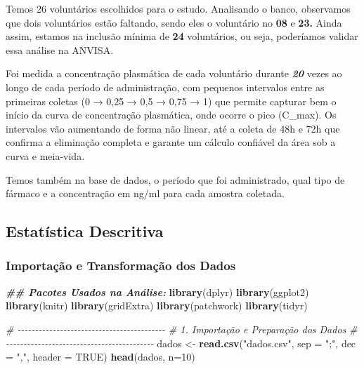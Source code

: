 \documentclass[
]{article}
\newenvironment{Shaded}{\begin{snugshade}}{\end{snugshade}}
\newcommand{\AttributeTok}[1]{\textcolor[rgb]{0.13,0.29,0.53}{#1}}
\newcommand{\CommentTok}[1]{\textcolor[rgb]{0.56,0.35,0.01}{\textit{#1}}}
\newcommand{\ConstantTok}[1]{\textcolor[rgb]{0.56,0.35,0.01}{#1}}
\newcommand{\DecValTok}[1]{\textcolor[rgb]{0.00,0.00,0.81}{#1}}
\newcommand{\DocumentationTok}[1]{\textcolor[rgb]{0.56,0.35,0.01}{\textbf{\textit{#1}}}}
\newcommand{\FunctionTok}[1]{\textcolor[rgb]{0.13,0.29,0.53}{\textbf{#1}}}
\newcommand{\NormalTok}[1]{#1}
\newcommand{\OtherTok}[1]{\textcolor[rgb]{0.56,0.35,0.01}{#1}}
\newcommand{\StringTok}[1]{\textcolor[rgb]{0.31,0.60,0.02}{#1}}
\begin{document}
Temos 26 voluntários escolhidos para o estudo. Analisando o banco,
observamos que dois voluntários estão faltando, sendo eles o voluntário
no \textbf{08} e \textbf{23.} Ainda assim, estamos na inclusão mínima de
\textbf{24} voluntários, ou seja, poderíamos validar essa análise na
ANVISA.

Foi medida a concentração plasmática de cada voluntário durante
\textbf{\emph{20}} vezes ao longo de cada período de administração, com
pequenos intervalos entre as primeiras coletas (0 → 0,25 → 0,5 → 0,75 →
1) que permite capturar bem o início da curva de concentração
plasmática, onde ocorre o pico (C\_max). Os intervalos vão aumentando de
forma não linear, até a coleta de 48h e 72h que confirma a eliminação
completa e garante um cálculo confiável da área sob a curva e meia-vida.

Temos também na base de dados, o período que foi administrado, qual tipo
de fármaco e a concentração em ng/ml para cada amostra coletada.

\hypertarget{estatuxedstica-descritiva}{%
\subsection{Estatística Descritiva}\label{estatuxedstica-descritiva}}

\hypertarget{importauxe7uxe3o-e-transformauxe7uxe3o-dos-dados}{%
\subsubsection{Importação e Transformação dos
Dados}\label{importauxe7uxe3o-e-transformauxe7uxe3o-dos-dados}}

\begin{Shaded}
\begin{Highlighting}[]
\DocumentationTok{\#\# Pacotes Usados na Análise:}
\FunctionTok{library}\NormalTok{(dplyr)}
\FunctionTok{library}\NormalTok{(ggplot2)}
\FunctionTok{library}\NormalTok{(knitr)}
\FunctionTok{library}\NormalTok{(gridExtra)}
\FunctionTok{library}\NormalTok{(patchwork)}
\FunctionTok{library}\NormalTok{(tidyr)}
\end{Highlighting}
\end{Shaded}

\begin{Shaded}
\begin{Highlighting}[]
\CommentTok{\# {-}{-}{-}{-}{-}{-}{-}{-}{-}{-}{-}{-}{-}{-}{-}{-}{-}{-}{-}{-}{-}{-}{-}{-}{-}{-}{-}{-}{-}{-}{-}{-}{-}{-}{-}{-}{-}{-}{-}{-}{-}{-}}
\CommentTok{\# 1. Importação e Preparação dos Dados}
\CommentTok{\# {-}{-}{-}{-}{-}{-}{-}{-}{-}{-}{-}{-}{-}{-}{-}{-}{-}{-}{-}{-}{-}{-}{-}{-}{-}{-}{-}{-}{-}{-}{-}{-}{-}{-}{-}{-}{-}{-}{-}{-}{-}{-}}
\NormalTok{dados }\OtherTok{\textless{}{-}} \FunctionTok{read.csv}\NormalTok{(}\StringTok{"dados.csv"}\NormalTok{, }\AttributeTok{sep =} \StringTok{";"}\NormalTok{, }\AttributeTok{dec =} \StringTok{","}\NormalTok{, }\AttributeTok{header =} \ConstantTok{TRUE}\NormalTok{)}
\FunctionTok{head}\NormalTok{(dados, }\AttributeTok{n=}\DecValTok{10}\NormalTok{)}
\end{Highlighting}
\end{Shaded}
\end{document}
